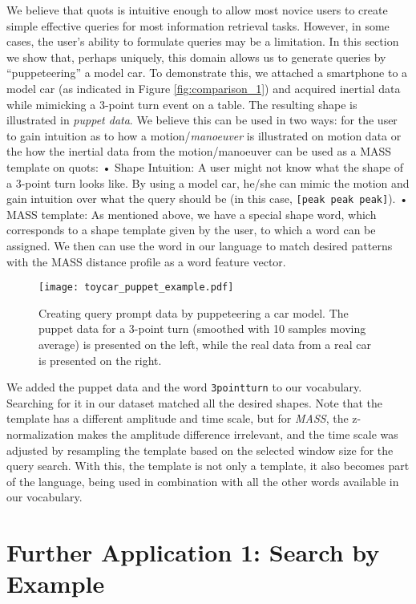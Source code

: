 We believe that \gls{quots} is intuitive enough to allow most novice users to create simple effective queries for most information retrieval tasks.  However, in some cases, the user’s ability to formulate queries may be a limitation. In this section we show that, perhaps uniquely, this domain allows us to generate queries by “puppeteering” a model car. To demonstrate this, we attached a smartphone to a model car (as indicated in Figure \ref{fig:comparison_1}) and acquired inertial data while mimicking a 3-point turn event on a table. The resulting shape is illustrated in \textit{puppet data}. We believe this can be used in two ways: for the user to gain intuition as to how a motion/\textit{manoeuver} is illustrated on motion data or the how the inertial data from the motion/manoeuver can be used as a MASS template on \gls{quots}: 
•	Shape Intuition: A user might not know what the shape of a 3-point turn looks like. By using a model car, he/she can mimic the motion and gain intuition over what the query should be (in this case, \texttt{[peak peak peak]}). 
•	MASS template: As mentioned above, we have a special shape word, which corresponds to a shape template given by the user, to which a word can be assigned. We then can use the word in our language to match desired patterns with the MASS distance profile as a word feature vector.  

\begin{figure}[h]
    \centering
    \texttt{[image: toycar\_puppet\_example.pdf]}
    \caption{Creating query prompt data by puppeteering a car model. The puppet data for a 3-point turn (smoothed with 10 samples moving average) is presented on the left, while the real data from a real car is presented on the right. }
    \label{fig:puppeteering}
\end{figure}

We added the puppet data and the word \texttt{3pointturn} to our vocabulary. Searching for it in our dataset matched all the desired shapes. Note that the template has a different amplitude and time scale, but for \textit{MASS}, the z-normalization makes the amplitude difference irrelevant, and the time scale was adjusted by resampling the template based on the selected window size for the query search. With this, the template is not only a template, it also becomes part of the language, being used in combination with all the other words available in our vocabulary.

\section{Further Application 1: Search by Example}

